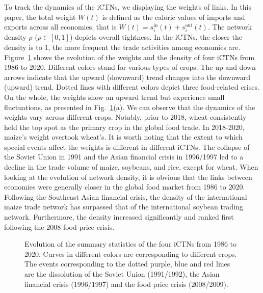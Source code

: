 \documentclass[preprint,3p,times,sort&compress]{elsarticle}
\begin{document}
To track the dynamics of the iCTNs, we displaying the weights of links. In this paper, the total weight $W(t)$ is defined as the caloric values of imports and exports across all economies, that is $W(t)=s_i^{\mathrm{in}}(t)+s_i^{\mathrm{out}}(t)$. The network density $\rho$ ($\rho \in [0,1]$) depicts overall tightness. In the iCTNs, the closer the density is to 1, the more frequent the trade activities among economies are. Figure~\ref{Fig:iCTN:sumW:density} shows the evolution of the weights and the density of four iCTNs from 1986 to 2020. Different colors stand for various types of crops. The up and down arrows indicate that the upward (downward) trend changes into the downward (upward) trend. Dotted lines with different colors depict three food-related crises. On the whole, the weights show an upward trend but experience small fluctuations, as presented in Fig.~\ref{Fig:iCTN:sumW:density}(a). We can observe that the dynamics of the weights vary across different crops. Notably, prior to 2018, wheat consistently held the top spot as the primary crop in the global food trade. In 2018-2020, maize's weight overtook wheat's. It is worth noting that the extent to which special events affect the weights is different in different iCTNs. The collapse of the Soviet Union in 1991 and the Asian financial crisis in 1996/1997 led to a decline in the trade volume of maize, soybeans, and rice, except for wheat. When looking at the evolution of network density, it is obvious that the links between economies were generally closer in the global food market from 1986 to 2020. Following the Southeast Asian financial crisis, the density of the international maize trade network has surpassed that of the international soybean trading network.  Furthermore, the density increased significantly and ranked first following the 2008 food price crisis.


 \begin{figure}[h!]
      \centering
     \subfigbottomskip=-1pt
     \subfigcapskip=-5pt
     \centering
      \caption{Evolution of the summary statistics of the four iCTNs from 1986 to 2020. Curves in different colors are corresponding to different crops. The events corresponding to the dotted purple, blue and red lines are the dissolution of the Soviet Union (1991/1992), the Asian financial crisis (1996/1997) and the food price crisis (2008/2009).}
      \label{Fig:iCTN:sumW:density}
\end{figure}
\end{document}
